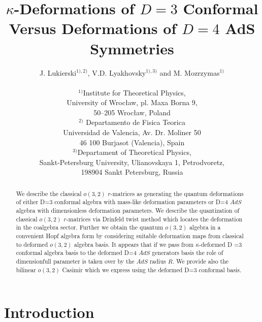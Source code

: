 \documentclass[a4paper,12pt,showkeys]{article}
\begin{document}
\renewcommand{\theequation}{\thesection.\arabic{equation}}

\title{$\kappa$-Deformations of $D=3$  Conformal
Versus Deformations of  $D=4$ AdS Symmetries}

\author{J. Lukierski$^{1),2)}$, V.D. Lyakhovsky$^{1), 3)}$
 and M. Mozrzymas$^{1)}$
\\ \\
$^{1)}$Institute for Theoretical Physics, \\
 University of Wroc{\l}aw,
pl. Maxa Borna 9,                             \\
 50--205 Wroc{\l}aw, Poland
\\
$^{2)}$
Departamento de Fisica Teorica\\
Universidad de Valencia, Av. Dr. Moliner 50 \\
46 100 Burjasot (Valencia), Spain
\\  
$^{3)}$Departament of Theoretical Physics, \\
Sankt-Petersburg
University,
         Ulianovskaya 1, Petrodvoretz, \\
198904 Sankt Petersburg, Russia}

\date{}
\maketitle
\thispagestyle{empty}

\begin{abstract}
We describe the classical $o(3,2)$ $r$-matrices as generating the
quantum
 deformations of either D=3 conformal algebra with mass-like deformation
parameters
 or D=4 $AdS$ algebra with dimensionless  deformation parameters.
 We describe the quantization of classical $o(3,2)$ $r$-matrices
   via Drinfeld twist
method which locates the deformation in the coalgebra sector.
 Further we obtain
  the quantum $o(3,2)$  algebra
  in
  a convenient Hopf algebra form
 by considering suitable deformation maps from classical to deformed
  $o(3,2)$ algebra basis. It appears that
   if we pass from $\kappa$-deformed D =3 conformal algebra basis to
   the deformed
      D=4 $AdS$ generators
    basis
    the role
   of dimensionfull parameter  is taken over by the $AdS$ radius $R$.
    We provide also
     the bilinear $o(3,2)$ Casimir  which we express using the
 deformed D=3 conformal  basis.
\end{abstract}


\section{Introduction}
\setcounter{page}{0}
\end{document}
